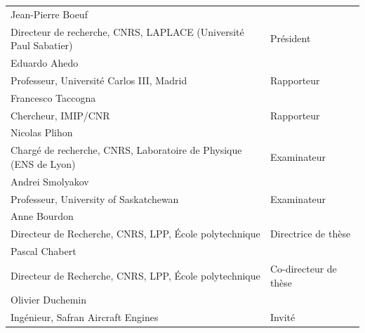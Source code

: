 \documentclass[a4paper]{article}
\newcommand{\jurynameA}{Jean-Pierre Boeuf}
\newcommand{\juryadressA}{Directeur de recherche, CNRS, LAPLACE (Université Paul Sabatier)}
\newcommand{\juryroleA}{Président}
\newcommand{\jurynameB}{Eduardo Ahedo}
\newcommand{\juryadressB}{Professeur, Université Carlos III, Madrid}
\newcommand{\juryroleB}{Rapporteur}
\newcommand{\jurynameC}{Francesco Taccogna}
\newcommand{\juryadressC}{Chercheur, IMIP/CNR}
\newcommand{\juryroleC}{Rapporteur}
\newcommand{\jurynameD}{Nicolas Plihon}
\newcommand{\juryadressD}{Chargé de recherche, CNRS, Laboratoire de Physique (ENS de Lyon)}
\newcommand{\juryroleD}{Examinateur}
\newcommand{\jurynameE}{Andrei Smolyakov}
\newcommand{\juryadressE}{Professeur, University of Saskatchewan}
\newcommand{\juryroleE}{Examinateur}
\newcommand{\jurynameF}{Anne Bourdon}
\newcommand{\juryadressF}{Directeur de Recherche, CNRS, LPP, École polytechnique}
\newcommand{\juryroleF}{Directrice de thèse}
\newcommand{\jurynameG}{Pascal Chabert}
\newcommand{\juryadressG}{Directeur de Recherche, CNRS, LPP, École polytechnique}
\newcommand{\juryroleG}{Co-directeur de thèse}
\newcommand{\jurynameH}{Olivier Duchemin}
\newcommand{\juryadressH}{Ingénieur, Safran Aircraft Engines}
\newcommand{\juryroleH}{Invité}
\begin{document}
\begin{textblock}{10}
	\label{jury} 																				%
	\begin{flushleft}
	\begin{tabular}{@{} L{9.5cm} R{4.5cm}}
		\jurynameA  \\ \juryadressA & \juryroleA \\[5pt]
		\jurynameB  \\ \juryadressB & \juryroleB \\[5pt]
		\jurynameC  \\ \juryadressC & \juryroleC \\[5pt]
		\jurynameD  \\ \juryadressD & \juryroleD \\[5pt]
		\jurynameE  \\ \juryadressE & \juryroleE \\[5pt]
		\jurynameF  \\ \juryadressF & \juryroleF \\[5pt]
		\jurynameG  \\ \juryadressG & \juryroleG \\[5pt]
		\jurynameH  \\ \juryadressH & \juryroleH \\[5pt]
	\end{tabular} 
	\end{flushleft}   
\end{textblock}
\end{document}

